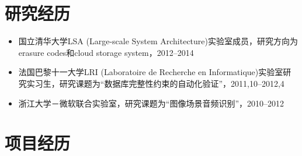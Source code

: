 \documentclass[letterpaper]{article}
\begin{document}
\section*{研究经历}
\begin{itemize}
    \item 国立清华大学LSA (Large-scale System Architecture)实验室成员，研究方向为erasure codes和cloud storage system，2012--2014
    \item 法国巴黎十一大学LRI (Laboratoire de Recherche en Informatique)实验室研究实习生，研究课题为“数据库完整性约束的自动化验证”，2011,10--2012,4
    \item 浙江大学－微软联合实验室，研究课题为“图像场景音频识别”，2010--2012
\end{itemize}

\section*{项目经历}
\end{document}
